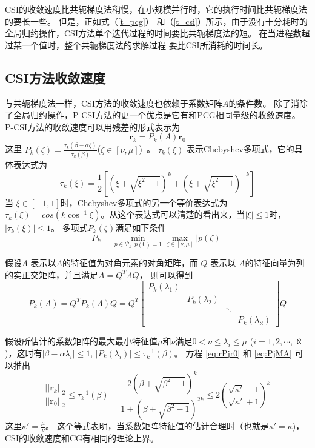 CSI的收敛速度比共轭梯度法稍慢，在小规模并行时，它的执行时间比共轭梯度法的要长一些。 
但是，正如式（\ref{t_pcg}） 和（\ref{t_csi}）所示，由于没有十分耗时的全局归约操作，CSI方法单个迭代过程的时间要比共轭梯度法的短。 
在当进程数超过某一个值时，整个共轭梯度法的求解过程 要比CSI所消耗的时间长。 


\subsection{CSI方法收敛速度} \label{solver:CSI:convergence_rate}

 
与共轭梯度法一样，CSI方法的收敛速度也依赖于系数矩阵$A$的条件数。  
除了消除了全局归约操作，P-CSI方法的更一个优点是它有和PCG相同量级的收敛速度。 
P-CSI方法的收敛速度可以用残差的形式表示为
\begin{equation}
\textbf{r}_k = P_k(A)\textbf{r}_0 \label{eq:rPjr0}
\end{equation}
这里
$P_k(\zeta) = \frac{\tau_k(\beta-\alpha \zeta)}{\tau_k(\beta)}$($ \zeta \in [\nu, \mu]$)~\cite{stiefel1958kernel}。
$\tau_k(\xi)$ 表示Chebyshev多项式，它的具体表达式为  
\begin{equation*}
\tau_k(\xi) =   \frac{1}{2}[(\xi+\sqrt{\xi^2-1})^k+(\xi+\sqrt{\xi^2-1})^{-k}]
\end{equation*}
当 $ \xi \in [-1,1]$时，Chebyshev多项式的另一个等价表达式为$\tau_k(\xi) = cos(k\cos^{-1} \xi)$。从这个表达式可以清楚的看出来，当$| \xi | \le 1$时，$|\tau_k(\xi)| \le 1$。
多项式$P_k(\zeta)$满足如下条件
\begin{equation}
P_k = \min_{p\in \mathcal{P}_k, p(0) = 1 }\max_{\zeta \in [\nu,\mu]} |p(\zeta)|
\end{equation}


假设$\Lambda$ 表示以$A$的特征值为对角元素的对角矩阵，而 $Q$ 表示以  $A$的特征向量为列的实正交矩阵，并且满足$A= Q^T\Lambda Q$， 则可以得到
\begin{equation}
P_k(A) = Q^T P_k(\Lambda)Q = Q^T \left [\begin{array}{cccc}
P_k(\lambda_1) & & &\\
& P_k(\lambda_2) & &\\
& & \ddots &\\
 & & & P_k(\lambda_\aleph)
\end{array} \right ] Q \label{eq:PjMA}
\end{equation}
 
假设所估计的系数矩阵的最大最小特征值$\mu$和$\nu$满足$0 < \nu \le \lambda_i \le \mu$ ($i = 1, 2, \cdots, \aleph$)，这时有$|\beta - \alpha \lambda_i| \le 1$, $|P_k(\lambda_i)| \le \tau^{-1}_k (\beta)$。
方程 \ref{eq:rPjr0} 和 \ref{eq:PjMA} 可以推出
\begin{equation}
\label{csi_convergence}
\frac{||\textbf{r}_k||_2}{||\textbf{r}_0||_2}  \le  \tau_k^{-1}(\beta) = \frac{2(\beta+\sqrt{\beta^2-1})^k}{1+(\beta+\sqrt{\beta^2-1})^{2k}} \le 2(\frac{\sqrt{\kappa'}-1}{\sqrt{\kappa'}+1})^k
\end{equation}
这里$\kappa' = \frac{\mu}{\nu}$。
这个等式表明，当系数矩阵特征值的估计合理时（也就是$\kappa' =\kappa$)，CSI的收敛速度和CG有相同的理论上界。

